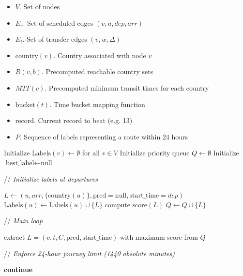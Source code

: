\documentclass{article}
\newcommand{\CommentLine}[1]{
    \State // \textit{#1}
}
\begin{document}
\begin{algorithmic}[1] %
    
    \Input
    \begin{itemize}
        \item $V$. Set of nodes
        \item $E_s$. Set of scheduled edges $(v,u,dep,arr)$
        \item $E_t$. Set of transfer edges $(v,w,\Delta)$
        \item $\text{country}(v)$. Country associated with node $v$
        \item $R(v,b)$. Precomputed reachable country sets
        \item $MTT(c)$. Precomputed minimum transit times for each country
        \item $\text{bucket}(t)$. Time bucket mapping function
        \item $\text{record}$. Current record to beat (e.g. 13)
    \end{itemize}

    \Output
    \begin{itemize}
        \item $P$. Sequence of labels representing a route within 24 hours
    \end{itemize}
    \vspace{0.5em} 

    \State Initialize $\text{Labels}(v) \leftarrow \emptyset$ for all $v \in V$
    \State Initialize priority queue $Q \leftarrow \emptyset$ 
    \State Initialize $\text{best\_label} \leftarrow \text{null}$

    \vspace{0.5em}
    \CommentLine{Initialize labels at departures}
            \State $L \leftarrow (u,arr,\{\text{country}(u)\},\text{pred}=\text{null},\text{start\_time}=dep)$
            \State $\text{Labels}(u) \leftarrow \text{Labels}(u) \cup \{L\}$
            \State compute $\text{score}(L)$
            \State $Q \leftarrow Q \cup \{L\}$
        \EndFor
    \EndFor

    \vspace{0.5em}
    \CommentLine{Main loop}
        \State extract $L=(v,t,C,\text{pred},\text{start\_time})$ with maximum score from $Q$

        \CommentLine{Enforce 24-hour journey limit (1440 absolute minutes)}
            \State \textbf{continue}
        \EndIf


\end{algorithmic}
\end{document}
